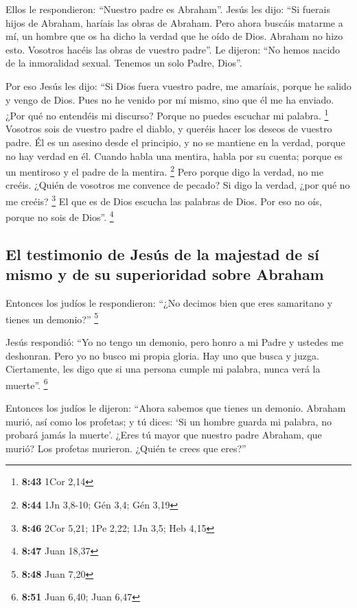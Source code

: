  Ellos le respondieron: ``Nuestro padre es Abraham''.
Jesús les dijo: ``Si fuerais hijos de Abraham, haríais las obras de
Abraham.  Pero ahora buscáis matarme a mí, un hombre que
os ha dicho la verdad que he oído de Dios. Abraham no hizo esto.
 Vosotros hacéis las obras de vuestro padre''. Le
dijeron: ``No hemos nacido de la inmoralidad sexual. Tenemos un solo
Padre, Dios''.

 Por eso Jesús les dijo: ``Si Dios fuera vuestro padre,
me amaríais, porque he salido y vengo de Dios. Pues no he venido por mí
mismo, sino que él me ha enviado.  ¿Por qué no entendéis
mi discurso? Porque no puedes escuchar mi palabra. \footnote{\textbf{8:43}
  1Cor 2,14}  Vosotros sois de vuestro padre el diablo, y
queréis hacer los deseos de vuestro padre. Él es un asesino desde el
principio, y no se mantiene en la verdad, porque no hay verdad en él.
Cuando habla una mentira, habla por su cuenta; porque es un mentiroso y
el padre de la mentira. \footnote{\textbf{8:44} 1Jn 3,8-10; Gén 3,4; Gén
  3,19}  Pero porque digo la verdad, no me creéis.
 ¿Quién de vosotros me convence de pecado? Si digo la
verdad, ¿por qué no me creéis? \footnote{\textbf{8:46} 2Cor 5,21; 1Pe
  2,22; 1Jn 3,5; Heb 4,15}  El que es de Dios escucha las
palabras de Dios. Por eso no oís, porque no sois de Dios''. \footnote{\textbf{8:47}
  Juan 18,37}

\hypertarget{el-testimonio-de-jesuxfas-de-la-majestad-de-suxed-mismo-y-de-su-superioridad-sobre-abraham}{%
\subsection{El testimonio de Jesús de la majestad de sí mismo y de su
superioridad sobre
Abraham}\label{el-testimonio-de-jesuxfas-de-la-majestad-de-suxed-mismo-y-de-su-superioridad-sobre-abraham}}

 Entonces los judíos le respondieron: ``¿No decimos bien
que eres samaritano y tienes un demonio?'' \footnote{\textbf{8:48} Juan
  7,20}

 Jesús respondió: ``Yo no tengo un demonio, pero honro a
mi Padre y ustedes me deshonran.  Pero yo no busco mi
propia gloria. Hay uno que busca y juzga.  Ciertamente,
les digo que si una persona cumple mi palabra, nunca verá la muerte''.
\footnote{\textbf{8:51} Juan 6,40; Juan 6,47}

 Entonces los judíos le dijeron: ``Ahora sabemos que
tienes un demonio. Abraham murió, así como los profetas; y tú dices: `Si
un hombre guarda mi palabra, no probará jamás la muerte'.
 ¿Eres tú mayor que nuestro padre Abraham, que murió? Los
profetas murieron. ¿Quién te crees que eres?''

